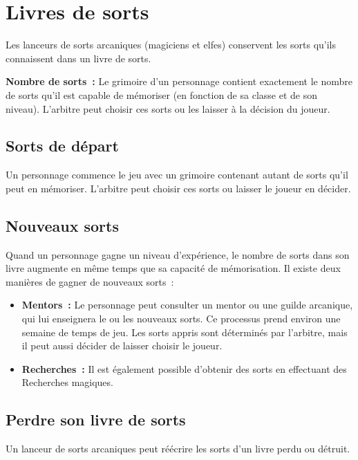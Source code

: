 \section{Livres de sorts}\label{livres-de-sorts}

Les lanceurs de sorts arcaniques (magiciens et elfes) conservent les
sorts qu'ils connaissent dans un livre de sorts.

\textbf{Nombre de sorts~:} Le grimoire d'un personnage contient
exactement le nombre de sorts qu'il est capable de mémoriser (en
fonction de sa classe et de son niveau). L'arbitre peut choisir ces
sorts ou les laisser à la décision du joueur.

\subsection{Sorts de départ}\label{sorts-de-duxe9part}

Un personnage commence le jeu avec un grimoire contenant autant de sorts
qu'il peut en mémoriser. L'arbitre peut choisir ces sorts ou laisser le
joueur en décider.

\subsection{Nouveaux sorts}\label{nouveaux-sorts}

Quand un personnage gagne un niveau d'expérience, le nombre de sorts
dans son livre augmente en même temps que sa capacité de mémorisation.
Il existe deux manières de gagner de nouveaux sorts~:

\begin{itemize}
  \item \textbf{Mentors~:} Le personnage peut consulter un mentor ou une
  guilde arcanique, qui lui enseignera le ou les nouveaux sorts. Ce
  processus prend environ une semaine de temps de jeu. Les sorts appris
  sont déterminés par l'arbitre, mais il peut aussi décider de laisser
  choisir le joueur.
  \item \textbf{Recherches~:} Il est également possible d'obtenir des sorts en
  effectuant des Recherches magiques.
\end{itemize}

\subsection{Perdre son livre de sorts}\label{perdre-son-livre-de-sorts}

Un lanceur de sorts arcaniques peut réécrire les sorts d'un livre perdu
ou détruit.

